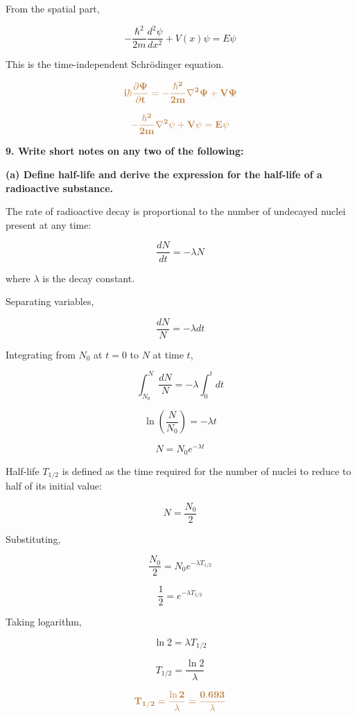 \documentclass[a4paper, 12pt]{article}
\begin{document}
From the spatial part,

\[
-\frac{\hbar^2}{2m}\frac{d^2\psi}{dx^2}
+
V(x)\psi
=
E\psi
\]

This is the time-independent Schrödinger equation.

\vspace{0.5cm}

\[
\textcolor{brown}{\mathbf{i\hbar \frac{\partial \Psi}{\partial t}
=
-\frac{\hbar^2}{2m}\nabla^2 \Psi + V\Psi}}
\]

\[
\textcolor{brown}{\mathbf{-\frac{\hbar^2}{2m}\nabla^2 \psi + V\psi = E\psi}}
\]


\textbf{9. Write short notes on any two of the following:}

\vspace{0.3cm}

\textbf{(a) Define half-life and derive the expression for the half-life of a radioactive substance.}

The rate of radioactive decay is proportional to the number of undecayed nuclei present at any time:

\[
\frac{dN}{dt} = -\lambda N
\]

where $\lambda$ is the decay constant.

Separating variables,

\[
\frac{dN}{N} = -\lambda dt
\]

Integrating from $N_0$ at $t=0$ to $N$ at time $t$,

\[
\int_{N_0}^{N} \frac{dN}{N}
=
-\lambda \int_{0}^{t} dt
\]

\[
\ln \left( \frac{N}{N_0} \right) = -\lambda t
\]

\[
N = N_0 e^{-\lambda t}
\]

Half-life $T_{1/2}$ is defined as the time required for the number of nuclei to reduce to half of its initial value:

\[
N = \frac{N_0}{2}
\]

Substituting,

\[
\frac{N_0}{2} = N_0 e^{-\lambda T_{1/2}}
\]

\[
\frac{1}{2} = e^{-\lambda T_{1/2}}
\]

Taking logarithm,

\[
\ln 2 = \lambda T_{1/2}
\]

\[
T_{1/2} = \frac{\ln 2}{\lambda}
\]

\[
\textcolor{brown}{\mathbf{T_{1/2} = \dfrac{\ln 2}{\lambda} = \dfrac{0.693}{\lambda}}}
\]
\end{document}
